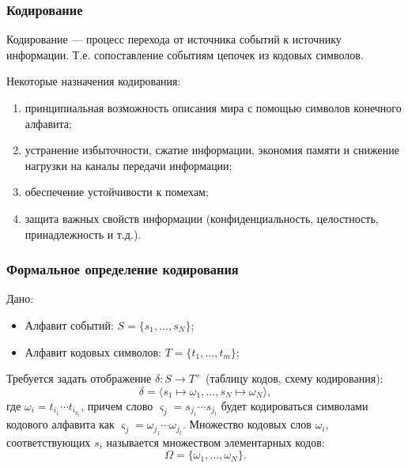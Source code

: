 \begin{frame}
    \frametitle{Кодирование}
    
    \begin{definition}
        \alert{Кодирование} --- процесс перехода от \alert{источника событий} к \alert{источнику информации}. Т.е.  сопоставление \alert{событиям} цепочек из \alert{кодовых символов}.
    \end{definition}
    
    Некоторые назначения кодирования:
    \begin{enumerate}
        \item принципиальная возможность описания мира с помощью символов конечного алфавита;
        \item устранение избыточности, сжатие информации, экономия памяти и снижение нагрузки на каналы передачи информации;
        \item обеспечение устойчивости к помехам;
        \item защита важных свойств информации (конфиденциальность, целостность, принадлежность и т.д.).
    \end{enumerate}
\end{frame}

\begin{frame}
    \frametitle{Формальное определение кодирования}
    
    \begin{definition}
        Дано:
        \begin{itemize}
            \item Алфавит \alert{событий}: $S=\{s_1,\ldots,s_N\}$;
            \item Алфавит кодовых \alert{символов}: $T=\{t_1,\ldots,t_m\}$;
        \end{itemize}
        
        Требуется задать отображение $\delta:S\to T^{+}$ (таблицу кодов, \alert{схему кодирования}):
        \[
            \delta=\langle s_1\mapsto \omega_1,\ldots,s_N\mapsto \omega_N\rangle,
        \]
        где $\omega_i=t_{i_1}\cdots t_{i_{k_i}}$, причем слово $\varsigma_j=s_{j_1}\cdots s_{j_t}$ будет кодироваться символами кодового алфавита как $\varsigma_j=\omega_{j_1}\cdots \omega_{j_t}$.
        Множество кодовых слов $\omega_i$, соответствующих $s_i$ называется множеством \alert{элементарных} кодов:
        \[\Omega=\{\omega_1,\ldots,\omega_N\}.\]
    \end{definition} 
\end{frame}

